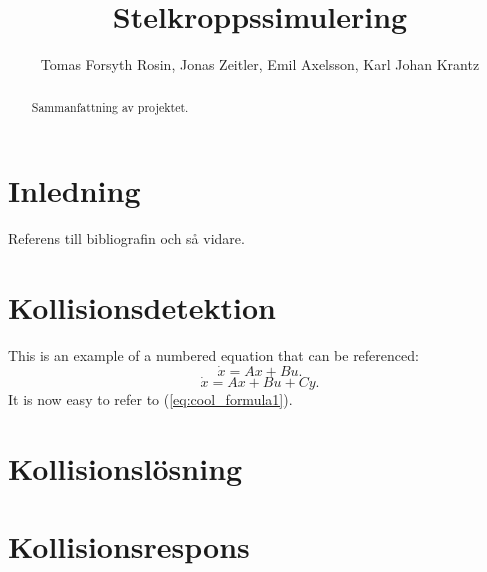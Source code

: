 \documentclass[a4paper,12pt,twocolumn,swedish]{article}
\begin{document}
\title{Stelkroppssimulering}
\author{Tomas Forsyth Rosin, Jonas Zeitler, Emil Axelsson, Karl Johan Krantz}
\begin{titlepage}
\maketitle
\thispagestyle{empty}
\end{titlepage}
\setcounter{page}{1}
\begin{abstract}
Sammanfattning av projektet.
\end{abstract}
\clearpage
\tableofcontents
\clearpage
\listoffigures
\clearpage
\listoftables
\clearpage
\setcounter{page}{1}
\section{Inledning}
Referens till bibliografin \cite{vella08} och så vidare.
\blindtext[1]
\section{Kollisionsdetektion}
This is an example of a numbered equation that can be referenced:
\begin{equation}\label{eq:cool_formula1}
\dot{x} = Ax + Bu.
\end{equation}
\begin{equation}\label{eq:cool_formula2}
\dot{x} = Ax + Bu + Cy.
\end{equation}
It is now easy to refer to (\ref{eq:cool_formula1}).
\blindtext[1]
\section{Kollisionslösning}
\blindtext[1]
\section{Kollisionsrespons}
\blindtext[1]
\end{document}
